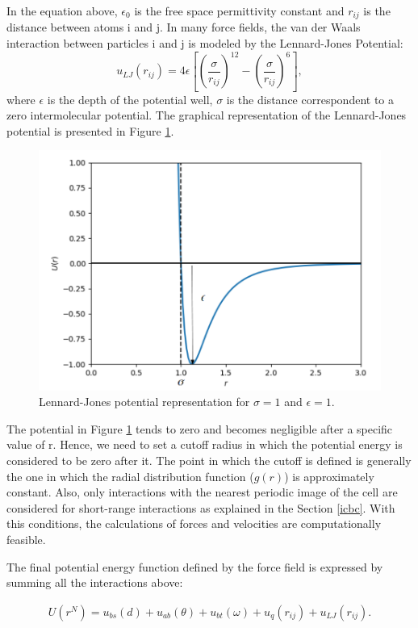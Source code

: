 In the equation above, $\epsilon _{0}$ is the free space permittivity constant and $r_{ij}$ is the distance between atoms i and j. In many force fields, the van der Waals interaction between particles i and j is modeled by the Lennard-Jones Potential:
\begin{equation}
u_{LJ}(r_{ij}) = 4 \epsilon
\left[ \left(\frac{\sigma}{r_{ij}} \right)^{12} - \left(\frac{\sigma}{r_{ij}} \right)^{6} \right],
\end{equation}
where  $\epsilon$ is the depth of the potential well, $\sigma$ is the distance correspondent to a zero intermolecular potential. The graphical representation of the Lennard-Jones potential is presented in Figure \ref{fig:lj}.
\begin{figure}[H]
	\centering
	\includegraphics[width=0.8\linewidth]{Figures/lj2}
	\caption{Lennard-Jones potential representation for $\sigma = 1$ and $\epsilon = 1$. }
	\label{fig:lj}
\end{figure}

The potential in Figure \ref{fig:lj} tends to zero and becomes negligible after a specific value of r. Hence, we need to set a cutoff radius in which the potential energy is considered to be zero after it. The point in which the cutoff is defined is generally the one in which the radial distribution function ($g(r)$) is approximately constant. Also, only interactions with the nearest periodic image of the cell are considered for short-range interactions as explained in the Section \ref{icbc}. With this conditions, the calculations of forces and velocities are computationally feasible.

The final potential energy function defined by the force field is expressed by summing all the interactions above:

\begin{equation}
\begin{aligned}
U(r^N) = u_{bs}(d) + u_{ab}(\theta) + u_{bt}(\omega) + u_{q}(r_{ij}) + u_{LJ}(r_{ij}) .
\end{aligned}
\end{equation}


